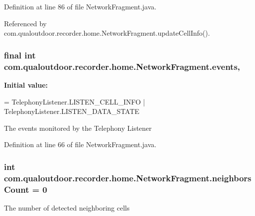Definition at line 86 of file Network\-Fragment.\-java.



Referenced by com.\-qualoutdoor.\-recorder.\-home.\-Network\-Fragment.\-update\-Cell\-Info().

\hypertarget{classcom_1_1qualoutdoor_1_1recorder_1_1home_1_1NetworkFragment_acc0a23073189e1cc9c36fe8dcafe107b}{
\subsubsection[{events}]{\setlength{\rightskip}{0pt plus 5cm}final int com.\-qualoutdoor.\-recorder.\-home.\-Network\-Fragment.\-events\hspace{0.3cm}{\ttfamily [static]}, {\ttfamily [private]}}}\label{classcom_1_1qualoutdoor_1_1recorder_1_1home_1_1NetworkFragment_acc0a23073189e1cc9c36fe8dcafe107b}
{\bfseries Initial value\-:}
\begin{DoxyCode}
= TelephonyListener.LISTEN\_CELL\_INFO
            | TelephonyListener.LISTEN\_DATA\_STATE
\end{DoxyCode}
The events monitored by the Telephony Listener 

Definition at line 66 of file Network\-Fragment.\-java.

\hypertarget{classcom_1_1qualoutdoor_1_1recorder_1_1home_1_1NetworkFragment_a98e0d9ad80321ac12baeacb95f7d6cd7}{
\subsubsection[{neighbors\-Count}]{\setlength{\rightskip}{0pt plus 5cm}int com.\-qualoutdoor.\-recorder.\-home.\-Network\-Fragment.\-neighbors\-Count = 0\hspace{0.3cm}{\ttfamily [private]}}}\label{classcom_1_1qualoutdoor_1_1recorder_1_1home_1_1NetworkFragment_a98e0d9ad80321ac12baeacb95f7d6cd7}
The number of detected neighboring cells 

